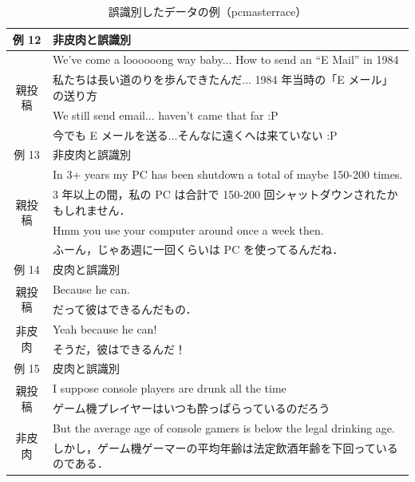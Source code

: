 \begin{table}[tb]
  \caption{誤識別したデータの例（pcmasterrace）}
  \label{tb:42_false_data_pc}
  \centering
  \begin{tabular}{c|p{120mm}} \hline

\multicolumn{1}{c}{例 12} & 非皮肉と誤識別 \\ \hline
\multirow{4}{*}{親投稿} & We've come a loooooong way baby... How to send an “E Mail” in 1984 \\ \cline{2-2}
& 私たちは長い道のりを歩んできたんだ... 1984 年当時の「E メール」の送り方 \\ \hline
\multirow{2}{*}{皮肉} & We still send email... haven't came that far :P \\ \cline{2-2}
& 今でも E メールを送る...そんなに遠くへは来ていない :P \\ \hline
\hline
\multicolumn{1}{c}{例 13} & 非皮肉と誤識別 \\ \hline
\multirow{4}{*}{親投稿} & In 3+ years my PC has been shutdown a total of maybe 150-200 times. \\ \cline{2-2}
& 3 年以上の間，私の PC は合計で 150-200 回シャットダウンされたかもしれません． \\ \hline
\multirow{2}{*}{皮肉} & Hmm you use your computer around once a week then. \\ \cline{2-2}
& ふーん，じゃあ週に一回くらいは PC を使ってるんだね． \\ \hline
\hline
\multicolumn{1}{c}{例 14} & 皮肉と誤識別 \\ \hline
\multirow{2}{*}{親投稿} & Because he can. \\ \cline{2-2}
& だって彼はできるんだもの．  \\ \hline
\multirow{2}{*}{非皮肉} & Yeah because he can! \\ \cline{2-2}
& そうだ，彼はできるんだ！ \\ \hline
\hline
\multicolumn{1}{c}{例 15} & 皮肉と誤識別 \\ \hline
\multirow{2}{*}{親投稿} & I suppose console players are drunk all the time \\ \cline{2-2}
& ゲーム機プレイヤーはいつも酔っぱらっているのだろう \\ \hline
\multirow{4}{*}{非皮肉} & But the average age of console gamers is below the legal drinking age. \\ \cline{2-2}
& しかし，ゲーム機ゲーマーの平均年齢は法定飲酒年齢を下回っているのである． \\ \hline

  \end{tabular}
\end{table}


